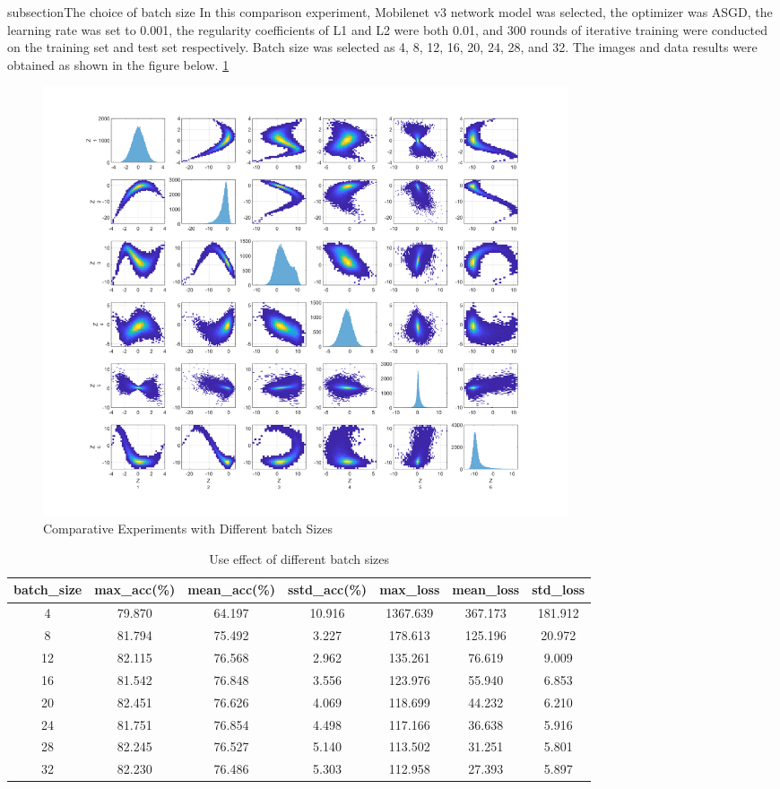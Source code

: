 \documentclass[a4paper,fleqn]{cas-sc}
\begin{document}
subsection{The choice of batch size}
In this comparison experiment, Mobilenet v3 network model was selected, the optimizer was ASGD, the learning rate was set to 0.001, the regularity coefficients of L1 and L2 were both 0.01, and 300 rounds of iterative training were conducted on the training set and test set respectively. Batch size was selected as 4, 8, 12, 16, 20, 24, 28, and 32. The images and data results were obtained as shown in the figure below. \ref{fig:f6}
\begin{figure}
\centering
\includegraphics[width=0.75\textwidth]{figs/f6.png}
\caption{Comparative Experiments with Different batch Sizes}
\label{fig:f6}
\end{figure}

\begin{table}
\centering
\caption{Use effect of different batch sizes}
\label{tab:mbv5}
\begin{tabular}{ccccccc}
\hline 
batch\_size & max\_acc(\%) & mean\_acc(\%) & sstd\_acc(\%) & max\_loss & mean\_loss & std\_loss \\
\hline  
4   & 79.870 &  64.197  & 10.916 &  1367.639  & 367.173 & 181.912 \\
 8   & 81.794  & 75.492 & 3.227 &  178.613  & 125.196 & 20.972 \\
 12   & 82.115   & 76.568 & 2.962 &  135.261  & 76.619 & 9.009 \\
 16  & 81.542   & 76.848 & 3.556 &  123.976  & 55.940 & 6.853 \\
 20  &  82.451  & 76.626 & 4.069 &  118.699  & 44.232 & 6.210 \\
 24  & 81.751  & 76.854 & 4.498 &  117.166  & 36.638 & 5.916 \\
 28  & 82.245  & 76.527 & 5.140 &  113.502  & 31.251 & 5.801 \\
 32  & 82.230  & 76.486 & 5.303 &  112.958  & 27.393 & 5.897 \\
\hline
\end{tabular}
\end{table}
\end{document}
